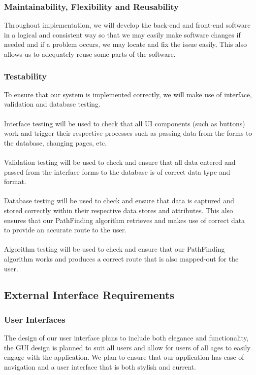 \documentclass[12pt]{article}
\begin{document}
\subsubsection{Maintainability, Flexibility and Reusability}
Throughout implementation, we will develop the back-end and front-end software in a logical and consistent way so that we may easily make software changes if needed and if a problem occurs, we may locate and fix the issue easily. This also allows us to adequately reuse some parts of the software.
\subsubsection{Testability}
To ensure that our system is implemented correctly, we will make use of interface, validation and database testing.\\\\
Interface testing will be used to check that all UI components (such as buttons) work and trigger their respective processes such as passing data from the forms to the database, changing pages, etc.\\\\
Validation testing will be used to check and ensure that all data entered and passed from the interface forms to the database is of correct data type and format.\\\\
Database testing will be used to check and ensure that data is captured and stored correctly within their respective data stores and attributes. This also ensures that our PathFinding algorithm retrieves and makes use of correct data to provide an accurate route to the user.\\\\
Algorithm testing will be used to check and ensure that our PathFinding algorithm works and produces a correct route that is also mapped-out for the user.


\subsection{External Interface Requirements}
\subsubsection{User Interfaces}
The design of our user interface plans to include both elegance and functionality, the GUI design is planned to suit all users and allow for users of all ages to easily engage with the application. We plan to ensure that our application has ease of navigation and a user interface that is both stylish and current.
\end{document}
